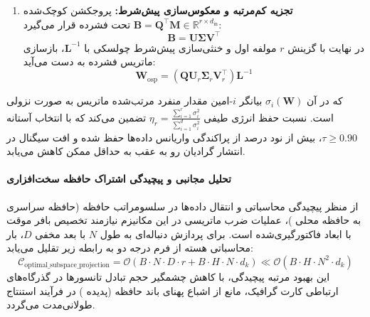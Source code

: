 \begin{enumerate}
    \item \textbf{تجزیه کم‌مرتبه و معکوس‌سازی پیش‌شرط:}
    پروجکشن کوچک‌شده $\mathbf{B} = \mathbf{Q}^\top \mathbf{M} \in \mathbb{R}^{r \times d_{\text{in}}}$ تحت  فشرده قرار می‌گیرد:
    \begin{equation}
    \mathbf{B} = \mathbf{U} \mathbf{\Sigma} \mathbf{V}^\top
    \end{equation}
    در نهایت با گزینش $r$ مولفه اول و خنثی‌سازی پیش‌شرط چولسکی با $\mathbf{L}^{-1}$، بازسازی ماتریس فشرده به دست می‌آید:
    \begin{equation}
    \mathbf{W}_{\text{osp}} = (\mathbf{Q} \mathbf{U}_r \mathbf{\Sigma}_r \mathbf{V}_r^\top) \mathbf{L}^{-1}
    \end{equation}
\end{enumerate}

که در آن $\sigma_i(\mathbf{W})$ بیانگر $i$-امین مقدار منفرد مرتب‌شده ماتریس به صورت نزولی است. نسبت حفظ انرژی طیفی $\eta_r = \frac{\sum_{i=1}^r \sigma_i^2}{\sum_{i=1}^{d} \sigma_i^2}$ تضمین می‌کند که با انتخاب آستانه $\tau \ge 0.90$، بیش از نود درصد از پراکندگی واریانس داده‌ها حفظ شده و افت سیگنال در انتشار گرادیان رو به عقب به حداقل ممکن کاهش می‌یابد.

\paragraph{تحلیل مجانبی و پیچیدگی اشتراک حافظه سخت‌افزاری}
از منظر پیچیدگی محاسباتی و انتقال داده‌ها در سلسومراتب حافظه (حافظه سراسری  به حافظه محلی )، عملیات ضرب ماتریسی در این مکانیزم نیازمند تخصیص بافر موقت با ابعاد فاکتورگیری‌شده است. برای پردازش دنباله‌ای به طول $N$ با بعد مخفی $D$، بار محاسباتی هسته از فرم درجه دو به رابطه زیر تقلیل می‌یابد:
\begin{equation}
\label{eq:complexity_optimal_subspace_projection}
\mathcal{C}_{\text{optimal\_subspace\_projection}} = \mathcal{O}\left( B \cdot N \cdot D \cdot r + B \cdot H \cdot N \cdot d_k \right) \ll \mathcal{O}\left( B \cdot H \cdot N^2 \cdot d_k \right)
\end{equation}
این بهبود مرتبه پیچیدگی، با کاهش چشمگیر حجم تبادل تانسورها در گذرگاه‌های ارتباطی کارت گرافیک، مانع از اشباع پهنای باند حافظه (پدیده ) در فرآیند استنتاج طولانی‌مدت می‌گردد.
